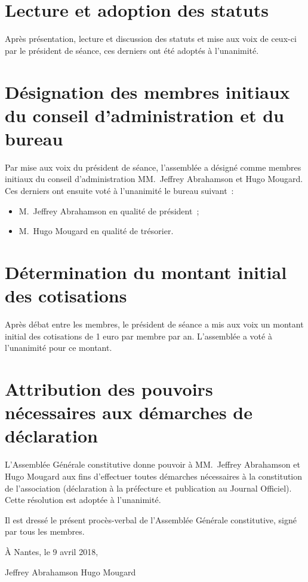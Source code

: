 \documentclass[12pt]{article}
\begin{document}
\section{Lecture et adoption des statuts}
\label{sec:lecture-et-adoption-des-statuts}

Après présentation, lecture et discussion des statuts et mise aux voix
de ceux-ci par le président de séance, ces derniers ont été adoptés à
l'unanimité.

\section{Désignation des membres initiaux du conseil d'administration
  et du bureau}
\label{sec:designation-des-membres}

Par mise aux voix du président de séance, l'assemblée a désigné comme
membres initiaux du conseil d'administration MM.~Jeffrey Abrahamson et
Hugo Mougard. Ces derniers ont ensuite voté à l'unanimité le bureau
suivant :

\begin{itemize}
\item M.~Jeffrey Abrahamson en qualité de président ;
\item M.~Hugo Mougard en qualité de trésorier.
\end{itemize}

\section{Détermination du montant initial des cotisations}
\label{sec:determination-du-montant-initial-des-cotisations}

Après débat entre les membres, le président de séance a mis aux voix
un montant initial des cotisations de 1 euro par membre par
an. L'assemblée a voté à l'unanimité pour ce montant.

\section{Attribution des pouvoirs nécessaires aux démarches de déclaration}
\label{sec:attribution-des-pouvoirs-necessaires-aux-demarches-de-declaration}

L'Assemblée Générale constitutive donne pouvoir à MM.~Jeffrey
Abrahamson et Hugo Mougard aux fins d'effectuer toutes démarches
nécessaires à la constitution de l'association (déclaration à la
préfecture et publication au Journal Officiel). Cette résolution est
adoptée à l'unanimité.

\vfill{}

Il est dressé le présent procès-verbal de l'Assemblée Générale
constitutive, signé par tous les membres.

\vspace{2cm}

\begin{flushright}
  À Nantes, le 9 avril 2018,
\end{flushright}

\vspace{2cm}

\hfill{}Jeffrey Abrahamson \hspace{4cm} Hugo Mougard\hfill{}

\vfill
\end{document}

